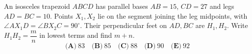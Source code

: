 An isosceles trapezoid $ABCD$ has parallel bases $AB=15$, $CD=27$ and legs $AD=BC=10$. Points $X_1,X_2$ lie on the segment joining the leg midpoints, with $\angle AX_1D=\angle BX_2C=90^\circ$. Their perpendicular feet on $AD,BC$ are $H_1,H_2$. Write $H_1H_2=\dfrac{m}{n}$ in lowest terms and find $m+n$.
\[\textbf{(A)}~83\quad\textbf{(B)}~85\quad\textbf{(C)}~88\quad\textbf{(D)}~90\quad\textbf{(E)}~92\]
